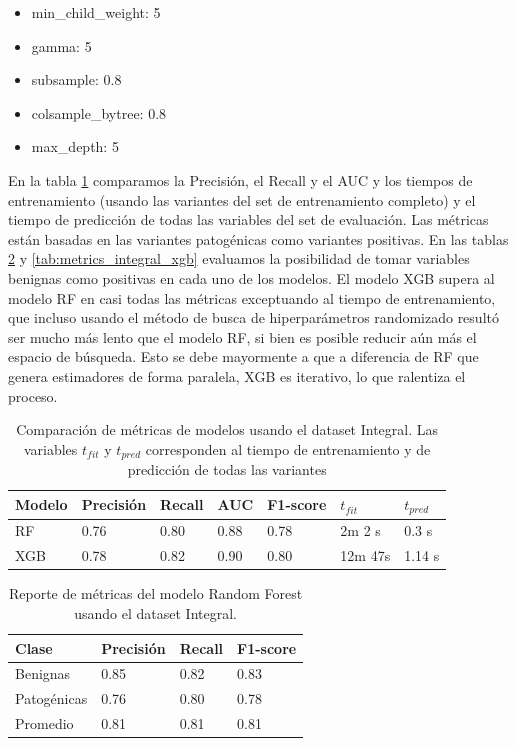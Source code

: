 \begin{itemize}
    \item min\_child\_weight: 5
    \item gamma: 5
    \item subsample: 0.8
    \item colsample\_bytree: 0.8
    \item max\_depth: 5
\end{itemize}

En la tabla \ref{tab:metrics_model_integral} comparamos la Precisión, el Recall y el AUC y los tiempos de entrenamiento (usando las variantes del set de entrenamiento completo) y el tiempo de predicción de todas las variables del set de evaluación. Las métricas están basadas en las variantes patogénicas como variantes positivas. En las tablas \ref{tab:metrics_integral_rf} y \ref{tab:metrics_integral_xgb} evaluamos la posibilidad de tomar variables benignas como positivas en cada uno de los modelos. El modelo XGB supera al modelo RF en casi todas las métricas exceptuando al tiempo de entrenamiento, que incluso usando el método de busca de hiperparámetros randomizado resultó ser mucho más lento que el modelo RF, si bien es posible reducir aún más el espacio de búsqueda. Esto se debe mayormente a que a diferencia de RF que genera estimadores de forma paralela, XGB es iterativo, lo que ralentiza el proceso. 

\begin{table}[H]
\centering
\begin{tabular}{|l|l|l|l|l|l|l|}
\hline
Modelo & Precisión & Recall & AUC & F1-score & $t_{fit}$ & $t_{pred}$ \\ \hline
RF & 0.76 & 0.80 & 0.88 & 0.78 & 2m 2 s & 0.3 s \\ \hline
XGB & 0.78 & 0.82 & 0.90 & 0.80 & 12m 47s & 1.14 s \\ \hline
\end{tabular}
\caption{Comparación de métricas de modelos usando el dataset Integral. Las variables $t_{fit}$ y $t_{pred}$ corresponden al tiempo de entrenamiento y de predicción de todas las variantes}
\label{tab:metrics_model_integral}

\end{table}


\begin{table}[H]
\centering
\begin{tabular}{|l|l|l|l|}
\hline
Clase        & Precisión & Recall & F1-score \\ \hline
Benignas     & 0.85      & 0.82   & 0.83     \\ \hline
Patogénicas  & 0.76      & 0.80   & 0.78     \\ \hline
Promedio     & 0.81      & 0.81   & 0.81     \\ \hline
\end{tabular}
\caption{Reporte de métricas del modelo Random Forest usando el dataset Integral.}
\label{tab:metrics_integral_rf}
\end{table}


